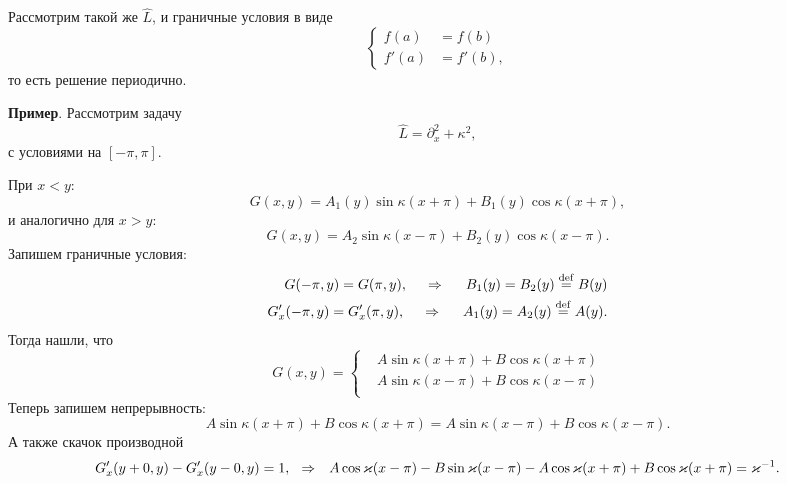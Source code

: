 Рассмотрим такой же $\hat{L}$, и граничные условия в виде
\begin{equation*}
    \left\{\begin{aligned}
        f(a) &= f(b) \\
        f'(a) &= f'(b),
    \end{aligned}\right.
\end{equation*}
то есть решение периодично. 



\textbf{Пример}.  Рассмотрим задачу
\begin{equation*}
    \hat{L} = \partial_x^2 + \kappa^2,
\end{equation*}
с условиями на $[-\pi, \pi]$. 

При $x < y$:
\begin{equation*}
    G(x, y) = A_1 (y) \sin \kappa(x + \pi) + B_1 (y) \cos \kappa( x + \pi),
\end{equation*}
и аналогично для $x > y$:
\begin{equation*}
    G(x, y) = A_2 \sin \kappa (x - \pi) + B_2 (y) \cos \kappa (x - \pi).
\end{equation*}
Запишем граничные условия:
\begin{align*}
    G(- \pi, y) = G(\pi, y), \hspace{0.5cm} \Rightarrow \hspace{0.5cm}
    B_1 (y) = B_2 (y) \overset{\mathrm{def}}{=} B(y) \\
    G'_x (-\pi, y) = G'_x (\pi, y),
    \hspace{0.5cm} \Rightarrow \hspace{0.5cm}
    A_1 (y) = A_2 (y) \overset{\mathrm{def}}{=}  A(y).
\end{align*}
Тогда нашли, что
\begin{equation*}
    G(x, y) = \left\{\begin{aligned}
        &A \sin \kappa (x + \pi) + B \cos \kappa (x + \pi) \\
        &A \sin \kappa (x - \pi) + B \cos \kappa (x - \pi) \\
    \end{aligned}\right.
\end{equation*}
Теперь запишем непрерывность:
\begin{equation*}
     A \sin \kappa (x + \pi) + B \cos \kappa (x + \pi) 
     = 
     A \sin \kappa (x - \pi) + B \cos \kappa (x - \pi).
\end{equation*}
А также скачок производной
\begin{equation*}
    G'_x(y + 0, y) - G'_x (y-0, y) = 1,
    \hspace{0.25cm} \Rightarrow \hspace{0.25cm}
        A \cos \kappa (x - \pi) - B \sin \kappa (x - \pi)  - 
        A \cos \kappa (x + \pi) + B \cos \kappa (x + \pi)
        = \kappa^{-1}.
\end{equation*}
